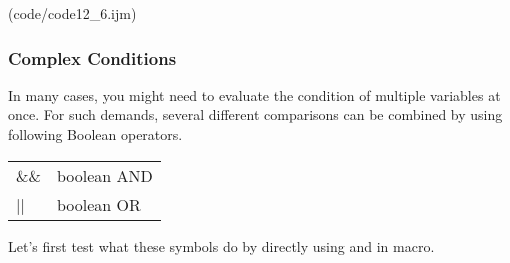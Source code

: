 (code/code12_6.ijm)

\subsubsection{Complex Conditions}
In many cases, you might need to evaluate the condition of multiple variables at once. 
For such demands, several different comparisons can be combined by using following Boolean operators.

\begin{indentCom}
 \begin{tabular*}{0.5\textwidth}{ l l }
\&\& & boolean AND\\
|| & boolean OR\\
\end{tabular*}
\end{indentCom}

Let's first test what these symbols do by directly using
 and  in macro.
